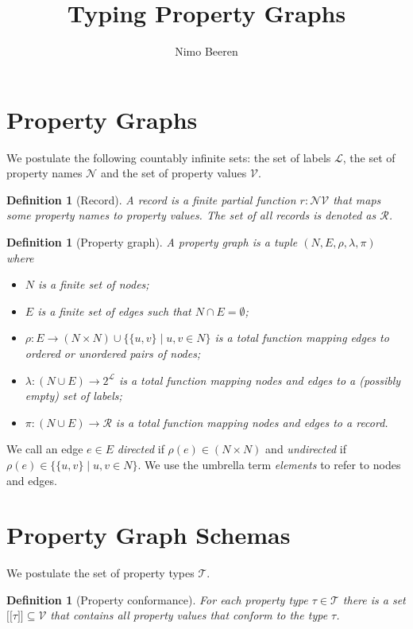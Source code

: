 \documentclass[a4paper]{article}
\title{Typing Property Graphs}
\author{Nimo Beeren}
\makeatletter
\newtheorem{definition}[theorem]{Definition}
\newcommand{\ptype}{\tau}
\newcommand{\ptypes}{\mathcal{T}}
\newcommand{\lsem}{\ensuremath{[\![}}
\newcommand{\rsem}{\ensuremath{]\!]}}
\newcommand{\sem}[1]{\ensuremath{\lsem #1 \rsem}}
\newcommand{\pto}{}%
\DeclareRobustCommand{\pto}{\mathrel{\mathpalette\p@to@gets\to}}
\newcommand{\p@to@gets}[2]{%
  \ooalign{\hidewidth$\m@th#1\mapstochar\mkern5mu$\hidewidth\cr$\m@th#1\to$\cr}%
}
\makeatother
\begin{document}
\section{Property Graphs}

We postulate the following countably infinite sets: the set of labels $\mathcal{L}$, the set of property names $\mathcal{N}$ and the set of property values $\mathcal{V}$.

\begin{definition}[Record]
  A \emph{record} is a finite partial function $r : \mathcal{N} \pto \mathcal{V}$ that maps some property names to property values. The set of all records is denoted as $\mathcal{R}$.
\end{definition}

\begin{definition}[Property graph]
  A \emph{property graph} is a tuple $(N, E, \rho, \lambda, \pi)$ where
  \begin{itemize}
    \item $N$ is a finite set of nodes;
    \item $E$ is a finite set of edges such that $N \cap E = \emptyset$;
    \item $\rho : E \to (N \times N) \cup \{\{u, v\} \mid u, v \in N\}$ is a total function mapping edges to ordered or unordered pairs of nodes;
    \item $\lambda : (N \cup E) \to 2^{\mathcal{L}}$ is a total function mapping nodes and edges to a (possibly empty) set of labels;
    \item $\pi : (N \cup E) \to \mathcal{R}$ is a total function mapping nodes and edges to a record.
  \end{itemize}
\end{definition}

We call an edge $e \in E$ \emph{directed} if $\rho(e) \in (N \times N)$ and \emph{undirected} if $\rho(e) \in \{\{u, v\} \mid u, v \in N\}$. We use the umbrella term \emph{elements} to refer to nodes and edges.

\section{Property Graph Schemas}


We postulate the set of property types $\mathcal{T}$.

\begin{definition}[Property conformance]
  For each property type $\ptype \in \ptypes$ there is a set $\sem{\ptype} \subseteq \mathcal{V}$ that contains all property values that \emph{conform} to the type $\ptype$.
\end{definition}
\end{document}
